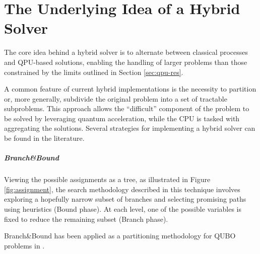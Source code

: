 \chapter{The Underlying Idea of a Hybrid Solver}

The core idea behind a hybrid solver is to alternate between classical processes and QPU-based solutions, enabling the handling of larger problems than those constrained by the limits outlined in Section \ref{sec:qpu-res}.

A common feature of current hybrid implementations is the necessity to partition or, more generally, subdivide the original problem into a set of tractable subproblems. 
This approach allows the ``difficult'' component of the problem to be solved by leveraging quantum acceleration, while the CPU is tasked with aggregating the solutions.
Several strategies for implementing a hybrid solver can be found in the literature.

\paragraph{Branch\&Bound} Viewing the possible assignments as a tree, as illustrated in Figure \ref{fig:assignment}, the search methodology described in this technique involves exploring a hopefully narrow subset of branches and selecting promising paths using heuristics (Bound phase). 
At each level, one of the possible variables is fixed to reduce the remaining subset (Branch phase).

Branch\&Bound has been applied as a partitioning methodology for QUBO problems in \cite{QBNB}.

